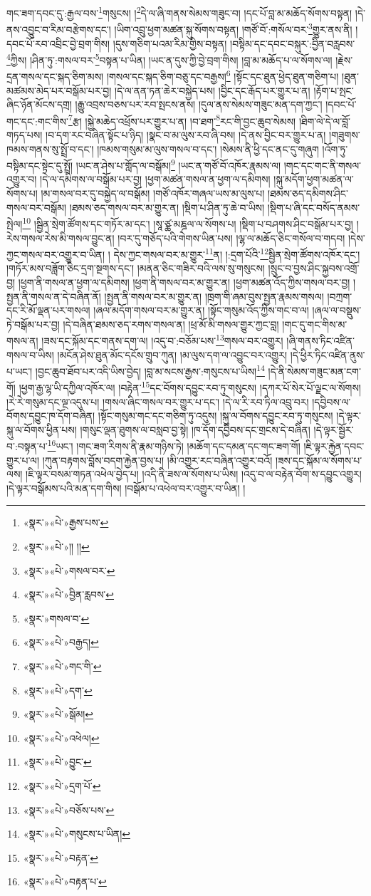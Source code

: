 གང་ཟག་དབང་དུ་:རྒྱལ་བས་\footnote{«སྣར་»«པེ་»རྒྱས་པས་}གསུངས། །\footnote{«སྣར་»«པེ་»།། །།}དེ་ལ་ཞི་གནས་སེམས་གཟུང་བ། །དང་པོ་བླ་མ་མཆོད་སོགས་བསྟན། །དེ་ནས་འབྱུང་བ་རིམ་བརྩེགས་དང་། །ཡིག་འབྲུ་ཕྱག་མཚན་སྐུ་སོགས་བསྟན། །གཙོ་བོ་:གསོལ་བར་\footnote{«སྣར་»«པེ་»གསལ་བར་}གྱུར་ནས་ནི། །དབང་པོ་རབ་འབྲིང་བྱེ་བྲག་གིས། །དུས་གཅིག་པའམ་རིམ་གྱིས་བསྟན། །བསྟིམ་དང་དབང་བསྐུར་:བྱིན་བརླབས་\footnote{«སྣར་»«པེ་»བྱིན་རླབས་}ཀྱིས། །ཤིན་ཏུ་:གསལ་བར་\footnote{«སྣར་»གསལ་བ་}བསྟན་པ་ཡིན། །ཡང་ན་དུས་ཀྱི་བྱེ་བྲག་གིས། །བླ་མ་མཆོད་པ་ལ་སོགས་ལ། །རྗེས་དྲན་གསལ་དང་སྐད་ཅིག་མས། །གསལ་དང་སྐད་ཅིག་བཅུ་དང་བརྒྱས།\footnote{«སྣར་»«པེ་»བརྒྱད།} །སྟོང་དང་ཐུན་ཕྱེད་ཐུན་གཅིག་པ། །ཐུན་མཚམས་མེད་པར་བསྒོམ་པར་བྱ། །དེ་ལ་ནན་ཏན་ཆེར་བསྐྱེད་པས། །བྱིང་དང་རྒོད་པར་གྱུར་པ་ན། །རྟོག་པ་སྤང་ཞིང་ཉོན་མོངས་དགྲ། །རྒྱུ་འབྲས་བཅས་པར་རབ་སྤངས་ནས། །དུལ་ནས་སེམས་གཟུང་མན་དག་ཀྱང་། །དབང་པོ་གང་དང་:གང་གིས་\footnote{«སྣར་»«པེ་»གང་གི་}རྩ། །སྐྱེ་མཆེད་འཕྲོས་པར་གྱུར་པ་ན། །བ་ཐག་\footnote{«སྣར་»«པེ་»དག་}རང་གི་བྱང་ཆུབ་སེམས། །ཐིག་ལེ་དེ་ལ་བློ་གཏད་པས། །བ་དག་རང་བཞིན་སྟོང་པ་ཉིད། །སྣང་བ་མ་ལུས་རབ་ཞི་བས། །དེ་ནས་བྱིང་བར་གྱུར་པ་ན། །གཟུགས་ཁམས་གནས་སུ་སྤྲོ་བ་དང་། །ཁམས་གསུམ་མ་ལུས་གསལ་བ་དང་། །སེམས་ནི་ཕྱི་དང་ནང་དུ་གཞུག །འོག་ཏུ་བསྟིམ་དང་སྟེང་དུ་སྤྲོ། །ཡང་ན་ཤེས་པ་གློད་ལ་བསྒོམ།\footnote{«སྣར་»«པེ་»སྒོམ།} །ཡང་ན་གཙོ་བོ་འཁོར་རྣམས་ལ། །གང་དང་གང་ནི་གསལ་འགྱུར་བ། །དེ་ལ་དམིགས་ལ་བསྒོམ་པར་བྱ། །ཕྱག་མཚན་གསལ་ན་ཕྱག་ལ་དམིགས། །སྐུ་མདོག་ཕྱག་མཚན་ལ་སོགས་པ། །མ་གསལ་བར་དུ་བསྐྱེད་ལ་བསྒོམ། །གཙོ་འཁོར་གཞལ་ཡས་མ་ལུས་པ། །ཐམས་ཅད་དམིགས་ཤིང་གསལ་བར་བསྒོམ། །ཐམས་ཅད་གསལ་བར་མ་གྱུར་ན། །སྡིག་པ་ཤིན་ཏུ་ཆེ་བ་ཡིས། །སྡིག་པ་ཞི་དང་བསོད་ནམས་སྤེལ།\footnote{«སྣར་»«པེ་»འཕེལ།} །སྦྱིན་སྲེག་ཚོགས་དང་གཏོར་མ་དང་། །སཱ་ཙྪ་མཎྜལ་ལ་སོགས་པ། །སྡིག་པ་བཤགས་ཤིང་བསྒོམ་པར་བྱ། །རེས་གསལ་རེས་མི་གསལ་བྱུང་ན། །བར་དུ་གཅོད་པའི་གེགས་ཡིན་པས། །ལྷ་ལ་མཆོད་ཅིང་གསོལ་བ་གདབ། །དེས་ཀྱང་གསལ་བར་འགྱུར་བ་ཡིན། །
དེས་ཀྱང་གསལ་བར་མ་གྱུར་\footnote{«སྣར་»«པེ་»བྱུང་}ན། །:དྲག་པོའི་\footnote{«སྣར་»«པེ་»དྲག་པོ་}སྦྱིན་སྲེག་ཚོགས་འཁོར་དང་། །གཏོར་མས་བཟློག་ཅིང་དྲག་སྔགས་དང་། །མནན་ཅིང་གཟིར་བའི་ལས་སུ་གསུངས། །སྲུང་བ་བྱས་ཤིང་སྐྱབས་འགྲོ་བྱ། །ཕྱག་ནི་གསལ་ན་ཕྱག་ལ་དམིགས། །ཕྱག་ནི་གསལ་བར་མ་གྱུར་ན། །ཕྱག་མཚན་འོད་ཀྱིས་གསལ་བར་བྱ། །སྤྱན་ནི་གསལ་ན་དེ་བཞིན་ནོ། །སྤྱན་ནི་གསལ་བར་མ་གྱུར་ན། །ཁྲག་གི་ཞམ་བུས་སྤྱན་རྣམས་གསལ། །བཀྲག་དང་རི་མོ་ལྡན་པར་གསལ། །ཞལ་མདོག་གསལ་བར་མ་གྱུར་ན། །སྟོང་གསུམ་འོད་ཀྱིས་གང་བ་ལ། །ཞལ་ལ་བསྡུས་ཏེ་བསྒོམ་པར་བྱ། །དེ་བཞིན་ཐམས་ཅད་རགས་གསལ་ན། །ཕྲ་མོ་མི་གསལ་གྱུར་ཀྱང་བླ། །གང་དུ་གང་གིས་མ་གསལ་ན། །ཟས་དང་སྐོམ་དང་གནས་དག་ལ། །འདུ་བ་:བཅོམ་པས་\footnote{«སྣར་»«པེ་»བཅོས་པས་}གསལ་བར་འགྱུར། །ཞི་གནས་ཏིང་འཛིན་གསལ་བ་ཡིས། །མངོན་ཤེས་ཐུན་མོང་དངོས་གྲུབ་ཀུན། །མ་ལུས་དག་ལ་འབྱུང་བར་འགྱུར། །དེ་ཕྱིར་ཏིང་འཛིན་ནུས་པ་ཡང་། །བྱང་ཆུབ་ཐོབ་པར་འདི་ཡིས་བྱེད། །བླ་མ་སངས་རྒྱས་:གསུངས་པ་ཡིས།\footnote{«སྣར་»«པེ་»གསུངས་པ་ཡིན།} །དེ་ནི་སེམས་གཟུང་མན་ངག་གོ། །ཕྱག་རྒྱ་ལྷ་ཡི་དཀྱིལ་འཁོར་ལ། །བརྟེན་\footnote{«སྣར་»«པེ་»བརྟན་}དང་བོགས་དབྱུང་རབ་ཏུ་གསུངས། །དཀར་པོ་སེར་པོ་ལྗང་ལ་སོགས། །རེ་རེ་གསུམ་དང་ལྔ་འདུས་པ། །གསལ་ཞིང་གསལ་བར་གྱུར་པ་དང་། །དེ་ལ་རི་རབ་ཏིལ་འབྲུ་བར། །དབྱིབས་ལ་བོགས་དབྱུང་ཁ་དོག་བཞིན། །སྟོང་གསུམ་གང་དང་གཅིག་ཏུ་འདུས། །སྐུ་ལ་བོགས་དབྱུང་རབ་ཏུ་གསུངས། །དེ་ལྟར་སྐུ་ལ་བོགས་ཕྱིན་པས། །གསུང་ལྡན་ཐུགས་ལ་བསླབ་བྱ་སྟེ། །ཁ་དོག་དབྱིབས་དང་གྲངས་དེ་བཞིན། །དེ་ལྟར་སྦྱོར་བ་:བསྟན་པ་\footnote{«སྣར་»«པེ་»བརྟན་པ་}ཡང་། །གང་ཟག་རིགས་ནི་རྣམ་གཉིས་ཏེ། །མཆོག་དང་དམན་དང་གང་ཟག་གོ། །ཇི་ལྟར་རྐྱེན་དབང་གྱུར་པ་ལ། །ཀུན་བརྟགས་བློས་བདག་རྐྱེན་བྱས་པ། །མི་འགྱུར་རང་བཞིན་འགྱུར་བའོ། །ཟས་དང་སྐོམ་ལ་སོགས་པ་ལས། །ཇི་ལྟར་བསམ་གཏན་འཕེལ་བྱེད་པ། །འདི་ནི་ཟས་ལ་སོགས་པ་ཡིས། །འདུ་བ་ལ་བརྟེན་བོག་ས་དབྱུང་འགྱུར། །དེ་ལྟར་བསྒོམས་པའི་མན་དག་གིས། །བསྒོམ་པ་འཕེལ་བར་འགྱུར་བ་ཡིན། །
